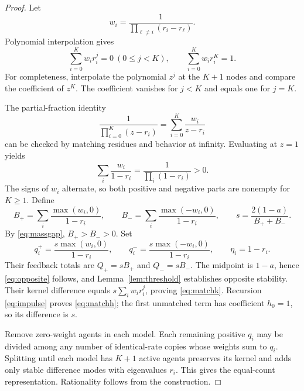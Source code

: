 \documentclass[11pt]{article}
\theoremstyle{remark}\newtheorem{remark}[theorem]{Remark}
\begin{document}
\begin{proof}
Let
\begin{equation}
 w_i=\frac{1}{\prod_{\ell\ne i}(r_i-r_\ell)}.
\end{equation}
Polynomial interpolation gives
\begin{equation}
 \sum_{i=0}^K w_i r_i^j=0\ (0\le j<K),\qquad
 \sum_{i=0}^K w_i r_i^K=1.\label{eq:moments}
\end{equation}
For completeness, interpolate the polynomial $z^j$ at the $K+1$ nodes and compare the coefficient of $z^K$. The coefficient vanishes for $j<K$ and equals one for $j=K$.

The partial-fraction identity
\begin{equation}
 \frac1{\prod_{i=0}^K(z-r_i)}=\sum_{i=0}^K\frac{w_i}{z-r_i}
\end{equation}
can be checked by matching residues and behavior at infinity. Evaluating at $z=1$ yields
\begin{equation}
 \sum_i\frac{w_i}{1-r_i}=\frac1{\prod_i(1-r_i)}>0.\label{eq:massgap}
\end{equation}
The signs of $w_i$ alternate, so both positive and negative parts are nonempty for $K\ge1$. Define
\begin{equation}
 B_+=\sum_i\frac{\max(w_i,0)}{1-r_i},\qquad
 B_-=\sum_i\frac{\max(-w_i,0)}{1-r_i},\qquad
 s=\frac{2(1-a)}{B_++B_-}.
\end{equation}
By \eqref{eq:massgap}, $B_+>B_->0$. Set
\begin{equation}
 q_i^+=\frac{s\max(w_i,0)}{1-r_i},\qquad
 q_i^-=\frac{s\max(-w_i,0)}{1-r_i},\qquad \eta_i=1-r_i.
\end{equation}
Their feedback totals are $Q_+=sB_+$ and $Q_-=sB_-$. The midpoint is $1-a$, hence \eqref{eq:opposite} follows, and Lemma~\ref{lem:threshold} establishes opposite stability. Their kernel difference equals $s\sum_iw_ir_i^j$, proving \eqref{eq:matchk}. Recursion \eqref{eq:impulse} proves \eqref{eq:matchh}; the first unmatched term has coefficient $h_0=1$, so its difference is $s$.

Remove zero-weight agents in each model. Each remaining positive $q_i$ may be divided among any number of identical-rate copies whose weights sum to $q_i$. Splitting until each model has $K+1$ active agents preserves its kernel and adds only stable difference modes with eigenvalues $r_i$. This gives the equal-count representation. Rationality follows from the construction.
\end{proof}
\end{document}

